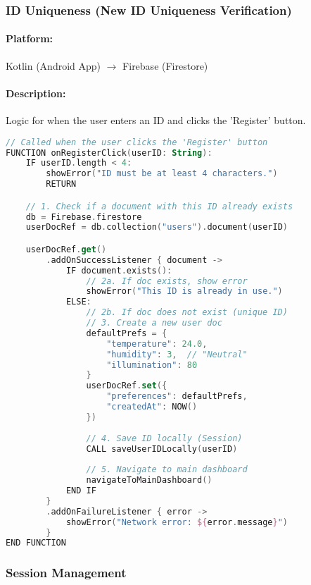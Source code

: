 \documentclass[conference]{IEEEtran}
\begin{document}
\subsubsection{ID Uniqueness (New ID Uniqueness Verification)}
\paragraph{Platform:} Kotlin (Android App) $\rightarrow$ Firebase (Firestore)
\paragraph{Description:} Logic for when the user enters an ID and clicks the 'Register' button.

\begin{lstlisting}[language=Kotlin]
// Called when the user clicks the 'Register' button
FUNCTION onRegisterClick(userID: String):
    IF userID.length < 4:
        showError("ID must be at least 4 characters.")
        RETURN

    // 1. Check if a document with this ID already exists
    db = Firebase.firestore
    userDocRef = db.collection("users").document(userID)

    userDocRef.get()
        .addOnSuccessListener { document ->
            IF document.exists():
                // 2a. If doc exists, show error
                showError("This ID is already in use.")
            ELSE:
                // 2b. If doc does not exist (unique ID)
                // 3. Create a new user doc
                defaultPrefs = {
                    "temperature": 24.0,
                    "humidity": 3,  // "Neutral"
                    "illumination": 80
                }
                userDocRef.set({ 
                    "preferences": defaultPrefs, 
                    "createdAt": NOW() 
                })
                
                // 4. Save ID locally (Session)
                CALL saveUserIDLocally(userID)
                
                // 5. Navigate to main dashboard
                navigateToMainDashboard()
            END IF
        }
        .addOnFailureListener { error ->
            showError("Network error: ${error.message}")
        }
END FUNCTION
\end{lstlisting}


\subsubsection{Session Management}
\end{document}
